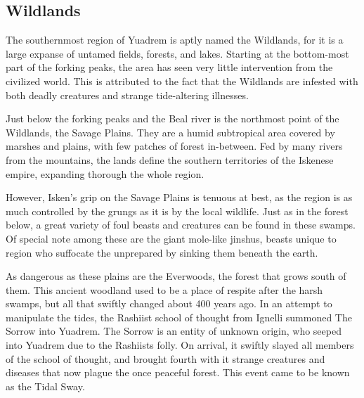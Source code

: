 

\subsection*{Wildlands} \label{ssec::wildlands}

The southernmost region of Yuadrem is aptly named the Wildlands, for it is a large expanse of untamed fields, forests, and lakes.
Starting at the bottom-most part of the forking peaks, the area has seen very little intervention from the civilized world.
This is attributed to the fact that the Wildlands are infested with both deadly creatures and strange tide-altering illnesses.

Just below the forking peaks and the Beal river is the northmost point of the Wildlands, the Savage Plains.
They are a humid subtropical area covered by marshes and plains, with few patches of forest in-between.
Fed by many rivers from the mountains, the lands define the southern territories of the Iskenese empire, expanding thorough the whole region.

However, Isken's grip on the Savage Plains is tenuous at best, as the region is as much controlled by the grungs as it is by the local wildlife.
Just as in the forest below, a great variety of foul beasts and creatures can be found in these swamps.
Of special note among these are the giant mole-like jinshus, beasts unique to region who suffocate the unprepared by sinking them beneath the earth.

As dangerous as these plains are the Everwoods, the forest that grows south of them.
This ancient woodland used to be a place of respite after the harsh swamps, but all that swiftly changed about 400 years ago.
In an attempt to manipulate the tides, the Rashiist school of thought from Ignelli summoned The Sorrow into Yuadrem.
The Sorrow is an entity of unknown origin, who seeped into Yuadrem due to the Rashiists folly.
On arrival, it swiftly slayed all members of the school of thought, and brought fourth with it strange creatures and diseases that now plague the once peaceful forest.
This event came to be known as the Tidal Sway.

